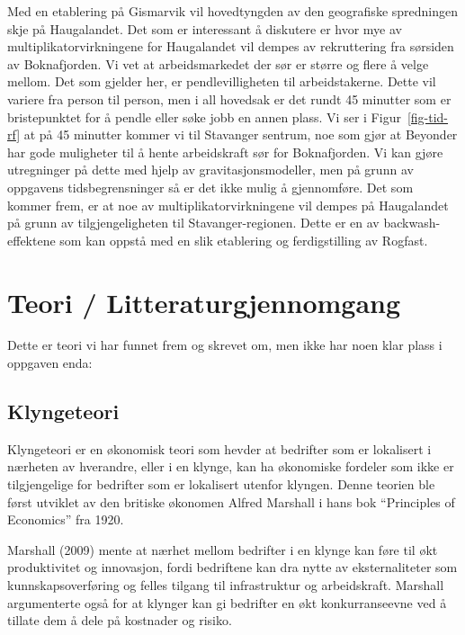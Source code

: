 \documentclass[
]{article}
\begin{document}
Med en etablering på Gismarvik vil hovedtyngden av den geografiske
spredningen skje på Haugalandet. Det som er interessant å diskutere er
hvor mye av multiplikatorvirkningene for Haugalandet vil dempes av
rekruttering fra sørsiden av Boknafjorden. Vi vet at arbeidsmarkedet der
sør er større og flere å velge mellom. Det som gjelder her, er
pendlevilligheten til arbeidstakerne. Dette vil variere fra person til
person, men i all hovedsak er det rundt 45 minutter som er bristepunktet
for å pendle eller søke jobb en annen plass. Vi ser i
Figur~\ref{fig-tid-rf} at på 45 minutter kommer vi til Stavanger
sentrum, noe som gjør at Beyonder har gode muligheter til å hente
arbeidskraft sør for Boknafjorden. Vi kan gjøre utregninger på dette med
hjelp av gravitasjonsmodeller, men på grunn av oppgavens
tidsbegrensninger så er det ikke mulig å gjennomføre. Det som kommer
frem, er at noe av multiplikatorvirkningene vil dempes på Haugalandet på
grunn av tilgjengeligheten til Stavanger-regionen. Dette er en av
backwash-effektene som kan oppstå med en slik etablering og
ferdigstilling av Rogfast.

\hypertarget{teori-litteraturgjennomgang}{%
\section{Teori /
Litteraturgjennomgang}\label{teori-litteraturgjennomgang}}

Dette er teori vi har funnet frem og skrevet om, men ikke har noen klar
plass i oppgaven enda:

\hypertarget{klyngeteori}{%
\subsection{Klyngeteori}\label{klyngeteori}}

Klyngeteori er en økonomisk teori som hevder at bedrifter som er
lokalisert i nærheten av hverandre, eller i en klynge, kan ha økonomiske
fordeler som ikke er tilgjengelige for bedrifter som er lokalisert
utenfor klyngen. Denne teorien ble først utviklet av den britiske
økonomen Alfred Marshall i hans bok ``Principles of Economics'' fra
1920.

Marshall (2009) mente at nærhet mellom bedrifter i en klynge kan føre
til økt produktivitet og innovasjon, fordi bedriftene kan dra nytte av
eksternaliteter som kunnskapsoverføring og felles tilgang til
infrastruktur og arbeidskraft. Marshall argumenterte også for at klynger
kan gi bedrifter en økt konkurranseevne ved å tillate dem å dele på
kostnader og risiko.
\end{document}
